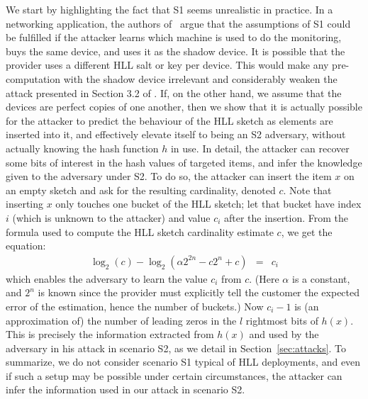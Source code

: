\documentclass[11pt]{article}
\newcommand{\mathilde}[1]{\todo[inline]{\textbf{Mathilde:} #1}\xspace}
\begin{document}
We start by highlighting the fact that S1 seems unrealistic in practice. In a networking application, the authors of~\cite{hllvuln} argue that the assumptions of S1 could be fulfilled if the attacker learns which machine is used to do the monitoring, buys the same device, and uses it as the shadow device. It is possible that the provider uses a different HLL salt or key per device. This would make any pre-computation with the shadow device irrelevant and considerably weaken the attack presented in Section 3.2 of \cite{hllvuln}. If, on the other hand, we assume that the devices are perfect copies of one another, then we show that it is actually possible for the attacker to predict the behaviour of the HLL sketch as elements are inserted into it, and effectively elevate itself to being an S2 adversary, without actually knowing the hash function $h$ in use. In detail, the attacker can recover some bits of interest in the hash values of targeted items, and infer the knowledge given to the adversary under S2. To do so, the attacker can insert the item $x$ on an empty sketch and ask for the resulting cardinality, denoted $c$. Note that inserting $x$ only touches one bucket of the HLL sketch; let that bucket have index $i$ (which is unknown to the attacker) and value $c_i$ after the insertion.  From the formula used to compute the HLL sketch cardinality estimate $c$, we get the equation:
\begin{eqnarray*}
   \log_2(c)-\log_2(\alpha 2^{2n} - c2^n + c) &=& c_i
\end{eqnarray*}
which enables the adversary to learn the value $c_i$ from $c$. (Here $\alpha$ is a constant, and $2^n$ is known since the provider must explicitly tell the customer the expected error of the estimation, hence the number of buckets.) Now $c_i-1$ is (an approximation of) the number of leading zeros in the $l$ rightmost bits of $h(x)$. This is precisely the information extracted from $h(x)$ and used by the adversary in his attack in scenario S2, as we detail in Section~\ref{sec:attacks}. %
To summarize, we do not consider scenario S1 typical of HLL deployments, and even if such a setup may be possible under certain circumstances, the attacker can infer the information used in our attack in scenario S2.

\end{document}
